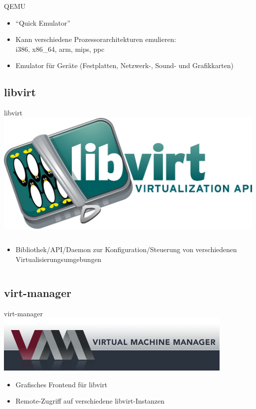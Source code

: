 \documentclass[pdflatex, ngerman]{beamer}
\newcommand{\mynote}[2]{{\note{\textbf{#1} #2\par}}}
\begin{document}
\begin{frame}{QEMU}
\begin{block}{}
  \begin{itemize}
    \item ``Quick Emulator'' \mynote{Quick:}{not}
    \item Kann verschiedene Prozessorarchitekturen emulieren: \\
		i386, x86\_64, arm, mips, ppc
    \item Emulator für Geräte (Festplatten, Netzwerk-, Sound- und Grafikkarten)
  \end{itemize}
\end{block}
\end{frame}

\subsection{libvirt}

\begin{frame}{libvirt}
\centering\includegraphics[width=0.5\columnwidth]{Libvirt_logo}
\begin{columns}
\column{\textwidth}
\begin{block}{}
  \begin{itemize}
    \item Bibliothek/API/Daemon zur Konfiguration/Steuerung von verschiedenen Virtualisierungsumgebungen
  \end{itemize}
\end{block}
\end{columns}
\end{frame}

\subsection{virt-manager}

\begin{frame}{virt-manager}
\centering\includegraphics[width=0.5\columnwidth]{virt-manager_logo}
\begin{block}{}
  \begin{itemize}
    \item Grafisches Frontend für libvirt
    \item Remote-Zugriff auf verschiedene libvirt-Instanzen
  \end{itemize}
\end{block}
\end{frame}
\end{document}
